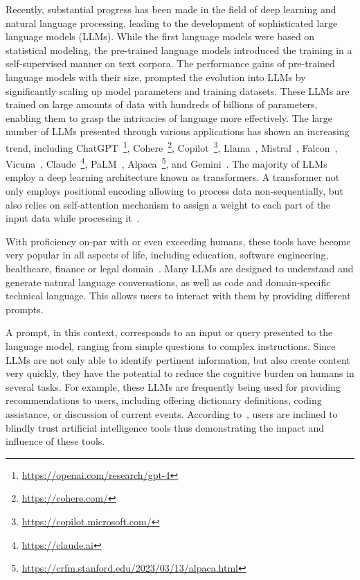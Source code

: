 \documentclass[sn-mathphys-num]{sn-jnl}%
\begin{document}
Recently, substantial progress has been made in the field of deep learning and natural language processing, leading to the development of sophisticated large language models (LLMs). 
While the first language models were based on statistical modeling, the pre-trained language models introduced the training in a self-supervised manner on text corpora. 
The performance gains of pre-trained language models with their size, prompted the evolution into LLMs by significantly scaling up model parameters and training datasets. 
These LLMs are trained on large amounts of data with hundreds of billions of parameters, enabling them to grasp the intricacies of language more effectively.
The large number of LLMs presented through various applications has shown an increasing trend, including ChatGPT~\footnote{\url{https://openai.com/research/gpt-4}}, Cohere~\footnote{\url{https://cohere.com/}}, Copilot~\footnote{\url{https://copilot.microsoft.com/}}, Llama~\cite{touvron2023llama}, Mistral~\cite{jiang2023mistral}, Falcon~\cite{almazrouei2023falcon}, Vicuna~\cite{vicuna2023}, Claude~\footnote{\url{https://claude.ai}}, PaLM~\cite{chowdhery2023palm}, Alpaca~\footnote{\url{https://crfm.stanford.edu/2023/03/13/alpaca.html}}, and Gemini~\cite{team2023gemini}.
The majority of LLMs employ a deep learning architecture known as transformers. A transformer not only employs positional encoding allowing to process data non-sequentially, but also relies on self-attention mechanism to assign a weight to each part of the input data while processing it~\cite{vaswani2017attention}.%

With proficiency on-par with or even exceeding humans, these tools have become very popular in all aspects of life, 
including education, software engineering, healthcare, finance or legal domain~\cite{naughton-2023}. Many LLMs are designed to understand and generate natural language conversations, as well as code and domain-specific technical language. %
This allows users to interact with them by providing different prompts. 

A prompt, in this context, corresponds to an input or query presented to the language model, ranging from simple questions to complex instructions.
Since LLMs are not only able to identify pertinent information, but also create content very quickly, they have the potential to reduce the cognitive burden on humans in several tasks. 
For example, these LLMs are frequently being used for providing recommendations to users, including offering dictionary definitions, coding assistance, or discussion of current events. 
According to~\cite{klichowski2020people}, users are inclined to blindly trust artificial intelligence tools thus demonstrating the impact and influence of these tools.
\end{document}
